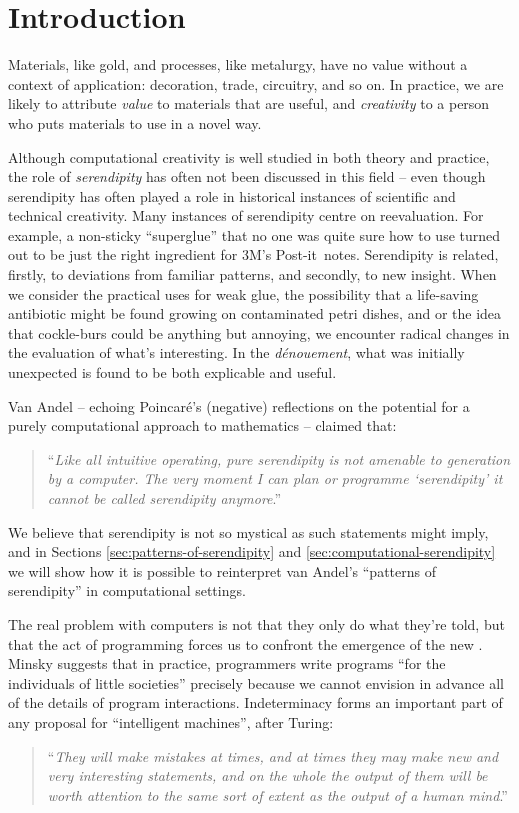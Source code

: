 \section{Introduction}

Materials, like gold, and processes, like metalurgy, have no value
without a context of application: decoration, trade, circuitry, and so
on.  In practice, we are likely to attribute \emph{value} to materials that
are useful, and \emph{creativity} to a person who puts materials to use in a
novel way.

Although computational creativity is well studied in both theory and
practice, the role of \emph{serendipity} has often not been discussed
in this field -- even though serendipity has often played a role in
historical instances of scientific and technical creativity.  Many
instances of serendipity centre on reevaluation.  For example, a
non-sticky ``superglue'' that no one was quite sure how to use turned
out to be just the right ingredient for 3M's
Post-it\texttrademark\ notes.
%
Serendipity is related, firstly, to deviations from familiar patterns,
and secondly, to new insight.
%
When we consider the practical uses for weak glue, the possibility
that a life-saving antibiotic might be found growing on contaminated
petri dishes, and or the idea that cockle-burs could be anything but
annoying, we encounter radical changes in the evaluation of what's
interesting.  In the \emph{d\'enouement}, what was initially
unexpected is found to be both explicable and useful.

Van Andel \citeyear{van1994anatomy} -- echoing Poincar\'e's
\citeyear{poincare1910creation} (negative) reflections on the potential
for a purely computational approach to mathematics -- claimed that:
\begin{quote}
``\emph{Like all intuitive operating, pure serendipity is not amenable
    to generation by a computer.  The very moment I can plan or
    programme `serendipity' it cannot be called serendipity
    anymore}.'' \cite{van1994anatomy}
\end{quote}
We believe that serendipity is not so mystical as such statements
might imply, and in Sections \ref{sec:patterns-of-serendipity} and
\ref{sec:computational-serendipity} we will show how it is possible to
reinterpret van Andel's ``patterns of serendipity'' in computational
settings.  

The real problem with computers is not that they only do what they're
told, but that the act of programming forces us to confront the
emergence of the new \cite{mead1932philosophy}.
%
Minsky \citeyear{minsky1967programming} suggests that in practice,
programmers write programs ``for the individuals of little societies''
precisely because we cannot envision in advance all of the details of
program interactions.
%
Indeterminacy forms an important part of any proposal for
``intelligent machines'', after Turing:
\begin{quote}
``\emph{They will make mistakes at times, and at times they may make
    new and very interesting statements, and on the whole the output
    of them will be worth attention to the same sort of extent as the
    output of a human mind}.''  \cite{turing-intelligent}
\end{quote}

